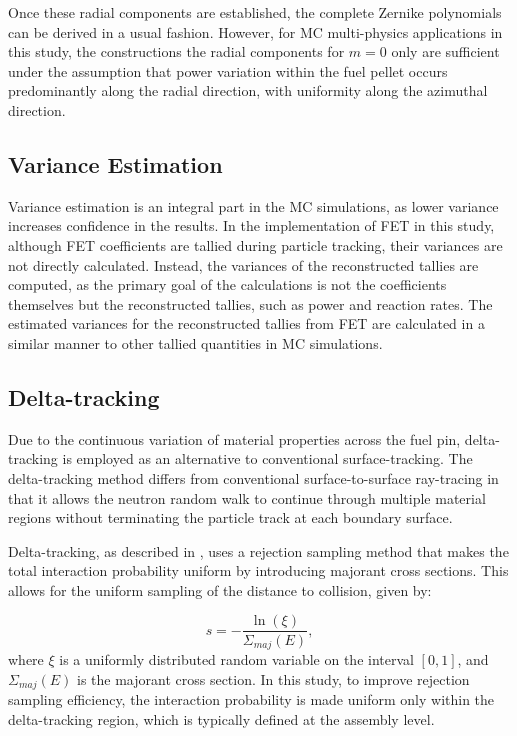 Once these radial components are established, the complete Zernike polynomials can be derived in a usual fashion. However, for MC multi-physics applications in this study, the constructions the radial components for $m=0$ only are sufficient under the assumption that power variation within the fuel pellet occurs predominantly along the radial direction, with uniformity along the azimuthal direction.

\subsection{Variance Estimation}\label{sec22a}

Variance estimation is an integral part in the MC simulations, as lower variance increases confidence in the results. In the implementation of FET in this study, although FET coefficients are tallied during particle tracking, their variances are not directly calculated. Instead, the variances of the reconstructed tallies are computed, as the primary goal of the calculations is not the coefficients themselves but the reconstructed tallies, such as power and reaction rates. The estimated variances for the reconstructed tallies from FET are calculated in a similar manner to other tallied quantities in MC simulations.

\subsection{Delta-tracking} \label{sec23}

Due to the continuous variation of material properties across the fuel pin, delta-tracking is employed as an alternative to conventional surface-tracking. The delta-tracking method differs from conventional surface-to-surface ray-tracing in that it allows the neutron random walk to continue through multiple material regions without terminating the particle track at each boundary surface.

Delta-tracking, as described in \cite{leppanen_2017, woodcock}, uses a rejection sampling method that makes the total interaction probability uniform by introducing majorant cross sections. This allows for the uniform sampling of the distance to collision, given by:

\begin{equation}
    s = -\frac{\ln{\left(\xi\right)}}{\Sigma_{maj}(E)},
    \label{eq8}
\end{equation}
where \(\xi\) is a uniformly distributed random variable on the interval \([0,1]\), and \(\Sigma_{maj}(E)\) is the majorant cross section. In this study, to improve rejection sampling efficiency, the interaction probability is made uniform only within the delta-tracking region, which is typically defined at the assembly level. 


